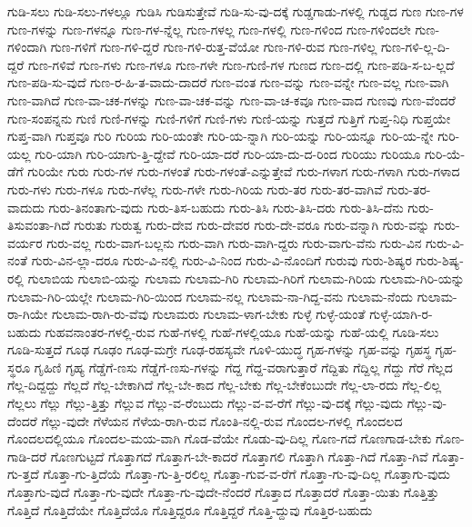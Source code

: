 {ಗುಡಿ-ಸಲು
ಗುಡಿ-ಸಲು-ಗಳಲ್ಲೂ
ಗುಡಿಸಿ
ಗುಡಿಸುತ್ತೇವೆ
ಗುಡಿ-ಸು-ವು-ದಕ್ಕೆ
ಗುಡ್ಡಗಾಡು-ಗಳಲ್ಲಿ
ಗುಡ್ಡದ
ಗುಣ
ಗುಣ-ಗಳ
ಗುಣ-ಗಳನ್ನು
ಗುಣ-ಗಳನ್ನೂ
ಗುಣ-ಗಳ-ನ್ನೆಲ್ಲ
ಗುಣ-ಗಳಲ್ಲ
ಗುಣ-ಗಳಲ್ಲಿ
ಗುಣ-ಗಳಿಂದ
ಗುಣ-ಗಳಿಂದಲೇ
ಗುಣ-ಗಳಿಂದಾಗಿ
ಗುಣ-ಗಳಿಗೆ
ಗುಣ-ಗಳಿ-ದ್ದರೆ
ಗುಣ-ಗಳಿ-ರುತ್ತ-ವೆಯೋ
ಗುಣ-ಗಳಿ-ರುವ
ಗುಣ-ಗಳಿಲ್ಲ
ಗುಣ-ಗಳಿ-ಲ್ಲ-ದಿ-ದ್ದರೆ
ಗುಣ-ಗಳಿವೆ
ಗುಣ-ಗಳು
ಗುಣ-ಗಳೂ
ಗುಣ-ಗಳೇ
ಗುಣ-ಗುಣಿ-ಗಳ
ಗುಣದ
ಗುಣ-ದಲ್ಲಿ
ಗುಣ-ಪಡಿ-ಸ-ಬ-ಲ್ಲದೆ
ಗುಣ-ಪಡಿ-ಸು-ವುದೆ
ಗುಣ-ರ-ಹಿ-ತ-ವಾದು-ದಾದರೆ
ಗುಣ-ವಂತ
ಗುಣ-ವನ್ನು
ಗುಣ-ವನ್ನೇ
ಗುಣ-ವಲ್ಲ
ಗುಣ-ವಾಗಿ
ಗುಣ-ವಾಗಿದೆ
ಗುಣ-ವಾ-ಚಕ-ಗಳನ್ನು
ಗುಣ-ವಾ-ಚಕ-ವನ್ನು
ಗುಣ-ವಾ-ಚ-ಕವೂ
ಗುಣ-ವಾದ
ಗುಣವು
ಗುಣ-ವೆಂದರೆ
ಗುಣ-ಸಂಪನ್ನನು
ಗುಣಿ
ಗುಣಿ-ಗಳನ್ನು
ಗುಣಿ-ಗಳಿಗೆ
ಗುಣಿ-ಗಳು
ಗುಣಿ-ಯನ್ನು
ಗುತ್ತದೆ
ಗುತ್ತಿಗೆ
ಗುಪ್ತ-ನಿಧಿ
ಗುಪ್ತಯೇ
ಗುಪ್ತ-ವಾಗಿ
ಗುಪ್ತವೂ
ಗುರಿ
ಗುರಿಯ
ಗುರಿ-ಯಂತೇ
ಗುರಿ-ಯ-ನ್ನಾಗಿ
ಗುರಿ-ಯನ್ನು
ಗುರಿ-ಯನ್ನೂ
ಗುರಿ-ಯ-ನ್ನೇ
ಗುರಿ-ಯಲ್ಲ
ಗುರಿ-ಯಾಗಿ
ಗುರಿ-ಯಾಗು-ತ್ತಿ-ದ್ದೇವೆ
ಗುರಿ-ಯಾ-ದರೆ
ಗುರಿ-ಯಾ-ದು-ದ-ರಿಂದ
ಗುರಿಯು
ಗುರಿಯೂ
ಗುರಿ-ಯೆ-ಡೆಗೆ
ಗುರಿಯೇ
ಗುರು
ಗುರು-ಗಳ
ಗುರು-ಗಳಂತೆ
ಗುರು-ಗಳಂತೆ-ಎನ್ನುತ್ತೇವೆ
ಗುರು-ಗಳಾಗ
ಗುರು-ಗಳಾಗಿ
ಗುರು-ಗಳಾದ
ಗುರು-ಗಳು
ಗುರು-ಗಳೂ
ಗುರು-ಗಳೆಲ್ಲ
ಗುರು-ಗಳೇ
ಗುರು-ಗಿರಿಯ
ಗುರು-ತರ
ಗುರು-ತರ-ವಾಗಿವೆ
ಗುರು-ತರ-ವಾದುದು
ಗುರು-ತಿನಂತಾಗು-ವುದು
ಗುರು-ತಿಸ-ಬಹುದು
ಗುರು-ತಿಸಿ
ಗುರು-ತಿಸಿ-ದರು
ಗುರು-ತಿಸಿ-ದೆನು
ಗುರು-ತಿಸುವಂತಾ-ಗಿದೆ
ಗುರುತು
ಗುರುತ್ವ
ಗುರು-ದೇವ
ಗುರು-ದೇವರ
ಗುರು-ದೇ-ವರೂ
ಗುರು-ವನ್ನಾಗಿ
ಗುರು-ವನ್ನು
ಗುರು-ವರ್ಯರ
ಗುರು-ವಲ್ಲ
ಗುರು-ವಾಗ-ಬಲ್ಲನು
ಗುರು-ವಾಗಿ
ಗುರು-ವಾಗಿ-ದ್ದರು
ಗುರು-ವಾಗು-ವೆನು
ಗುರು-ವಿನ
ಗುರು-ವಿ-ನಂತೆ
ಗುರು-ವಿನ-ಲ್ಲಾ-ದರೂ
ಗುರು-ವಿ-ನಲ್ಲಿ
ಗುರು-ವಿ-ನಿಂದ
ಗುರು-ವಿ-ನೊಂದಿಗೆ
ಗುರುವು
ಗುರು-ಶಿಷ್ಯರ
ಗುರು-ಶಿಷ್ಯ-ರಲ್ಲಿ
ಗುಲಾಬಿಯ
ಗುಲಾಬಿ-ಯನ್ನು
ಗುಲಾಮ
ಗುಲಾಮ-ಗಿರಿ
ಗುಲಾಮ-ಗಿರಿಗೆ
ಗುಲಾಮ-ಗಿರಿಯ
ಗುಲಾಮ-ಗಿರಿ-ಯನ್ನು
ಗುಲಾಮ-ಗಿರಿ-ಯಲ್ಲೇ
ಗುಲಾಮ-ಗಿರಿ-ಯಿಂದ
ಗುಲಾಮ-ನಲ್ಲ
ಗುಲಾಮ-ನಾ-ಗಿದ್ದ-ವನು
ಗುಲಾಮ-ನೆಂದು
ಗುಲಾಮ-ರಾ-ಗಿಯೇ
ಗುಲಾಮ-ರಾಗಿ-ರು-ವೆವು
ಗುಲಾಮರು
ಗುಲಾಮ-ಳಾಗ-ಬೇಕು
ಗುಳ್ಳೆ
ಗುಳ್ಳೆ-ಯಂತೆ
ಗುಳ್ಳೆ-ಯಾಗಿ-ರ-ಬಹುದು
ಗುಹವನಾಂತರ-ಗಳಲ್ಲಿ-ರುವ
ಗುಹೆ-ಗಳಲ್ಲಿ
ಗುಹೆ-ಗಳಲ್ಲಿಯೂ
ಗುಹೆ-ಯನ್ನು
ಗುಹೆ-ಯಲ್ಲಿ
ಗೂಡಿ-ಸಲು
ಗೂಡಿ-ಸುತ್ತದೆ
ಗೂಢ
ಗೂಢಂ
ಗೂಢ-ಮಗ್ರೇ
ಗೂಢ-ರಹಸ್ಯವೇ
ಗೂಳಿ-ಯುದ್ಧ
ಗೃಹ-ಗಳನ್ನು
ಗೃಹ-ವನ್ನು
ಗೃಹಸ್ಥ
ಗೃಹ-ಸ್ಥರೂ
ಗೃಹಿಣಿ
ಗೃಹ್ಯ
ಗೆಡ್ಡೆಗೆ-ಣಸು
ಗೆಡ್ಡೆಗೆ-ಣಸು-ಗಳನ್ನು
ಗೆದ್ದ
ಗೆದ್ದ-ವರಾಗುತ್ತಾರೆ
ಗೆದ್ದಿತು
ಗೆದ್ದಿಲ್ಲ
ಗೆದ್ದು
ಗೆರೆ
ಗೆಲ್ಲದ
ಗೆಲ್ಲ-ದಿದ್ದದ್ದು
ಗೆಲ್ಲದೆ
ಗೆಲ್ಲ-ಬೇಕಾಗಿದೆ
ಗೆಲ್ಲ-ಬೇ-ಕಾದ
ಗೆಲ್ಲ-ಬೇಕು
ಗೆಲ್ಲ-ಬೇಕೆಂಬುದೇ
ಗೆಲ್ಲ-ಲಾ-ರದು
ಗೆಲ್ಲ-ಲಿಲ್ಲ
ಗೆಲ್ಲಲು
ಗೆಲ್ಲು
ಗೆಲ್ಲು-ತ್ತಿತ್ತು
ಗೆಲ್ಲುವ
ಗೆಲ್ಲು-ವ-ರೆಂಬುದು
ಗೆಲ್ಲು-ವ-ವ-ರೆಗೆ
ಗೆಲ್ಲು-ವು-ದಕ್ಕೆ
ಗೆಲ್ಲು-ವುದು
ಗೆಲ್ಲು-ವು-ದೆಂದರೆ
ಗೆಲ್ಲು-ವುದೇ
ಗೆಳೆಯನ
ಗೆಳೆಯ-ರಾಗಿ-ರುವ
ಗೊಂತಿ-ನಲ್ಲಿ-ರುವ
ಗೊಂದಲ-ಗಳಲ್ಲಿ
ಗೊಂದಲದ
ಗೊಂದಲದಲ್ಲಿಯೂ
ಗೊಂದಲ-ಮಯ-ವಾಗಿ
ಗೊಡ-ವೆಯೇ
ಗೊಡು-ವು-ದಿಲ್ಲ
ಗೊಣ-ಗದೆ
ಗೊಣಗಾಡ-ಬೇಕು
ಗೊಣ-ಗಾಡಿ-ದರೆ
ಗೊಣಗುಟ್ಟದೆ
ಗೊತ್ತಾಗದೆ
ಗೊತ್ತಾಗ-ಬೇ-ಕಾದರೆ
ಗೊತ್ತಾಗಲಿ
ಗೊತ್ತಾಗಿ
ಗೊತ್ತಾ-ಗಿದೆ
ಗೊತ್ತಾ-ಗಿವೆ
ಗೊತ್ತಾ-ಗು-ತ್ತದೆ
ಗೊತ್ತಾ-ಗು-ತ್ತಿದೆಯೆ
ಗೊತ್ತಾ-ಗು-ತ್ತಿ-ರಲಿಲ್ಲ
ಗೊತ್ತಾ-ಗುವ-ವ-ರೆಗೆ
ಗೊತ್ತಾ-ಗು-ವು-ದಿಲ್ಲ
ಗೊತ್ತಾಗು-ವುದು
ಗೊತ್ತಾಗು-ವುದೆ
ಗೊತ್ತಾ-ಗು-ವುದೇ
ಗೊತ್ತಾ-ಗು-ವುದೇ-ನೆಂದರೆ
ಗೊತ್ತಾದ
ಗೊತ್ತಾದರೆ
ಗೊತ್ತಾ-ಯಿತು
ಗೊತ್ತಿತ್ತು
ಗೊತ್ತಿದೆ
ಗೊತ್ತಿದೆಯೇ
ಗೊತ್ತಿದೆಯೊ
ಗೊತ್ತಿದ್ದರೂ
ಗೊತ್ತಿದ್ದರೆ
ಗೊತ್ತಿ-ದ್ದುವು
ಗೊತ್ತಿರ-ಬಹುದು
}
